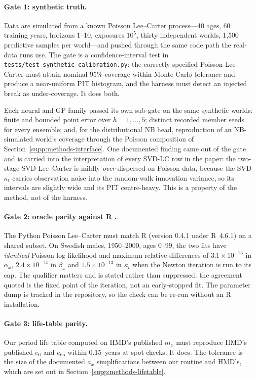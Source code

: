 \paragraph{Gate 1: synthetic truth.} Data are simulated from a known Poisson
Lee--Carter process---40 ages, 60 training years, horizons $1$--$10$,
exposures $10^5$, thirty independent worlds, 1{,}500 predictive samples per
world---and pushed through the same code path the real-data runs use. The
gate is a confidence-interval test in
\texttt{tests/test\_synthetic\_calibration.py}: the correctly specified
Poisson Lee--Carter must attain nominal 95\% coverage within Monte Carlo
tolerance and produce a near-uniform PIT histogram, and the harness must
detect an injected break as under-coverage. It does both.

Each neural and GP family passed its own sub-gate on the same synthetic
worlds: finite and bounded point error over $h=1,\dots,5$; distinct recorded
member seeds for every ensemble; and, for the distributional NB head,
reproduction of an NB-simulated world's coverage through the Poisson
composition of Section~\ref{supp:methods-interface}. One documented finding
came out of the gate and is carried into the interpretation of every SVD-LC
row in the paper: the two-stage SVD Lee--Carter is mildly \emph{over}-dispersed
on Poisson data, because the SVD $\kappa_t$ carries observation noise into the
random-walk innovation variance, so its intervals are slightly wide and its
PIT centre-heavy. This is a property of the method, not of the harness.

\paragraph{Gate 2: oracle parity against R .} The Python Poisson
Lee--Carter must match R  (version 0.4.1 under R~4.6.1) on a
shared subset. On Swedish males, 1950--2000, ages 0--99, the two fits have
\emph{identical} Poisson log-likelihood and maximum relative differences of
$3.1\times10^{-15}$ in $\alpha_x$, $2.4\times10^{-14}$ in $\beta_x$ and
$1.5\times10^{-13}$ in $\kappa_t$ when the Newton iteration is run to its cap.
The qualifier matters and is stated rather than suppressed: the agreement
quoted is the fixed point of the iteration, not an early-stopped fit. The
 parameter dump is tracked in the repository, so the check can be
re-run without an R installation.

\paragraph{Gate 3: life-table parity.} Our period life table computed on HMD's
published $m_x$ must reproduce HMD's published $e_0$ and $e_{65}$ within
0.15~years at spot checks. It does. The tolerance is the size of the
documented $a_x$ simplifications between our routine and HMD's, which are set
out in Section~\ref{supp:methods-lifetable}.
